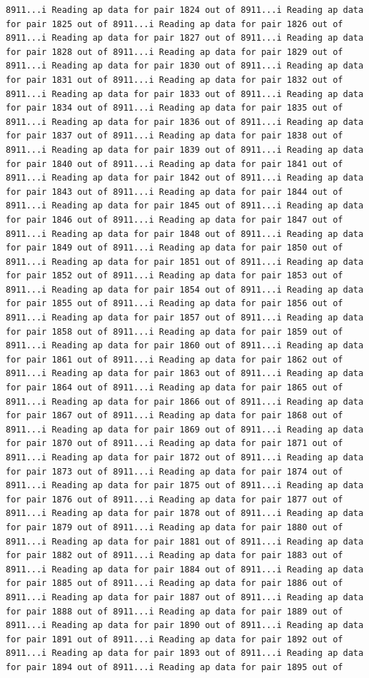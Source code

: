 \documentclass[
]{article}
\begin{document}
\begin{verbatim}
8911...i Reading ap data for pair 1824 out of 8911...i Reading ap data for pair 1825 out of 8911...i Reading ap data for pair 1826 out of 8911...i Reading ap data for pair 1827 out of 8911...i Reading ap data for pair 1828 out of 8911...i Reading ap data for pair 1829 out of 8911...i Reading ap data for pair 1830 out of 8911...i Reading ap data for pair 1831 out of 8911...i Reading ap data for pair 1832 out of 8911...i Reading ap data for pair 1833 out of 8911...i Reading ap data for pair 1834 out of 8911...i Reading ap data for pair 1835 out of 8911...i Reading ap data for pair 1836 out of 8911...i Reading ap data for pair 1837 out of 8911...i Reading ap data for pair 1838 out of 8911...i Reading ap data for pair 1839 out of 8911...i Reading ap data for pair 1840 out of 8911...i Reading ap data for pair 1841 out of 8911...i Reading ap data for pair 1842 out of 8911...i Reading ap data for pair 1843 out of 8911...i Reading ap data for pair 1844 out of 8911...i Reading ap data for pair 1845 out of 8911...i Reading ap data for pair 1846 out of 8911...i Reading ap data for pair 1847 out of 8911...i Reading ap data for pair 1848 out of 8911...i Reading ap data for pair 1849 out of 8911...i Reading ap data for pair 1850 out of 8911...i Reading ap data for pair 1851 out of 8911...i Reading ap data for pair 1852 out of 8911...i Reading ap data for pair 1853 out of 8911...i Reading ap data for pair 1854 out of 8911...i Reading ap data for pair 1855 out of 8911...i Reading ap data for pair 1856 out of 8911...i Reading ap data for pair 1857 out of 8911...i Reading ap data for pair 1858 out of 8911...i Reading ap data for pair 1859 out of 8911...i Reading ap data for pair 1860 out of 8911...i Reading ap data for pair 1861 out of 8911...i Reading ap data for pair 1862 out of 8911...i Reading ap data for pair 1863 out of 8911...i Reading ap data for pair 1864 out of 8911...i Reading ap data for pair 1865 out of 8911...i Reading ap data for pair 1866 out of 8911...i Reading ap data for pair 1867 out of 8911...i Reading ap data for pair 1868 out of 8911...i Reading ap data for pair 1869 out of 8911...i Reading ap data for pair 1870 out of 8911...i Reading ap data for pair 1871 out of 8911...i Reading ap data for pair 1872 out of 8911...i Reading ap data for pair 1873 out of 8911...i Reading ap data for pair 1874 out of 8911...i Reading ap data for pair 1875 out of 8911...i Reading ap data for pair 1876 out of 8911...i Reading ap data for pair 1877 out of 8911...i Reading ap data for pair 1878 out of 8911...i Reading ap data for pair 1879 out of 8911...i Reading ap data for pair 1880 out of 8911...i Reading ap data for pair 1881 out of 8911...i Reading ap data for pair 1882 out of 8911...i Reading ap data for pair 1883 out of 8911...i Reading ap data for pair 1884 out of 8911...i Reading ap data for pair 1885 out of 8911...i Reading ap data for pair 1886 out of 8911...i Reading ap data for pair 1887 out of 8911...i Reading ap data for pair 1888 out of 8911...i Reading ap data for pair 1889 out of 8911...i Reading ap data for pair 1890 out of 8911...i Reading ap data for pair 1891 out of 8911...i Reading ap data for pair 1892 out of 8911...i Reading ap data for pair 1893 out of 8911...i Reading ap data for pair 1894 out of 8911...i Reading ap data for pair 1895 out of 
\end{verbatim}
\end{document}
